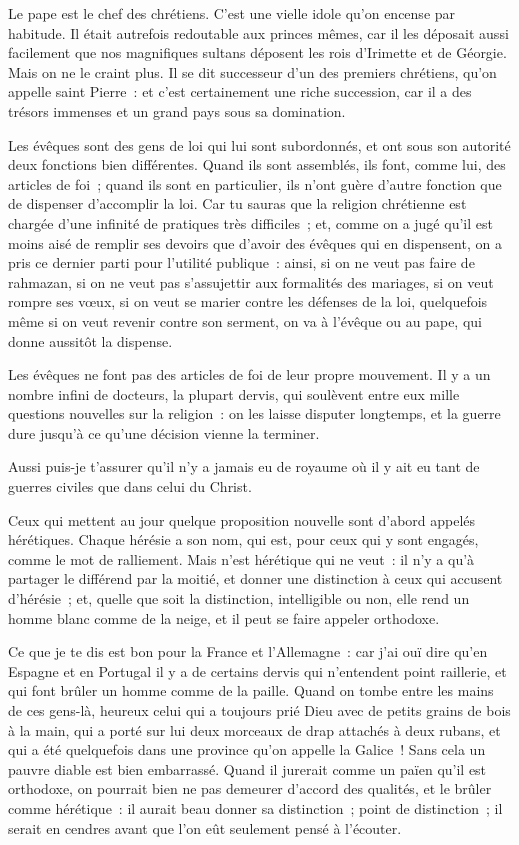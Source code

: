 \documentclass[french,twoside]{book} %
\begin{document}
\noindent Le pape est le chef des chrétiens. C’est une vielle idole qu’on encense par habitude. Il était autrefois redoutable aux princes mêmes, car il les déposait aussi facilement que nos magnifiques sultans déposent les rois d’Irimette et de Géorgie. Mais on ne le craint plus. Il se dit successeur d’un des premiers chrétiens, qu’on appelle saint Pierre : et c’est certainement une riche succession, car il a des trésors immenses et un grand pays sous sa domination.\par
Les évêques sont des gens de loi qui lui sont subordonnés, et ont sous son autorité deux fonctions bien différentes. Quand ils sont assemblés, ils font, comme lui, des articles de foi ; quand ils sont en particulier, ils n’ont guère d’autre fonction que de dispenser d’accomplir la loi. Car tu sauras que la religion chrétienne est chargée d’une infinité de pratiques très difficiles ; et, comme on a jugé qu’il est moins aisé de remplir ses devoirs que d’avoir des évêques qui en dispensent, on a pris ce dernier parti pour l’utilité publique : ainsi, si on ne veut pas faire de rahmazan, si on ne veut pas s’assujettir aux formalités des mariages, si on veut rompre ses vœux, si on veut se marier contre les défenses de la loi, quelquefois même si on veut revenir contre son serment, on va à l’évêque ou au pape, qui donne aussitôt la dispense.\par
Les évêques ne font pas des articles de foi de leur propre mouvement. Il y a un nombre infini de docteurs, la plupart dervis, qui soulèvent entre eux mille questions nouvelles sur la religion : on les laisse disputer longtemps, et la guerre dure jusqu’à ce qu’une décision vienne la terminer.\par
Aussi puis-je t’assurer qu’il n’y a jamais eu de royaume où il y ait eu tant de guerres civiles que dans celui du Christ.\par
Ceux qui mettent au jour quelque proposition nouvelle sont d’abord appelés hérétiques. Chaque hérésie a son nom, qui est, pour ceux qui y sont engagés, comme le mot de ralliement. Mais n’est hérétique qui ne veut : il n’y a qu’à partager le différend par la moitié, et donner une distinction à ceux qui accusent d’hérésie ; et, quelle que soit la distinction, intelligible ou non, elle rend un homme blanc comme de la neige, et il peut se faire appeler orthodoxe.\par
Ce que je te dis est bon pour la France et l’Allemagne : car j’ai ouï dire qu’en Espagne et en Portugal il y a de certains dervis qui n’entendent point raillerie, et qui font brûler un homme comme de la paille. Quand on tombe entre les mains de ces gens-là, heureux celui qui a toujours prié Dieu avec de petits grains de bois à la main, qui a porté sur lui deux morceaux de drap attachés à deux rubans, et qui a été quelquefois dans une province qu’on appelle la Galice ! Sans cela un pauvre diable est bien embarrassé. Quand il jurerait comme un païen qu’il est orthodoxe, on pourrait bien ne pas demeurer d’accord des qualités, et le brûler comme hérétique : il aurait beau donner sa distinction ; point de distinction ; il serait en cendres avant que l’on eût seulement pensé à l’écouter.\par
\end{document}
